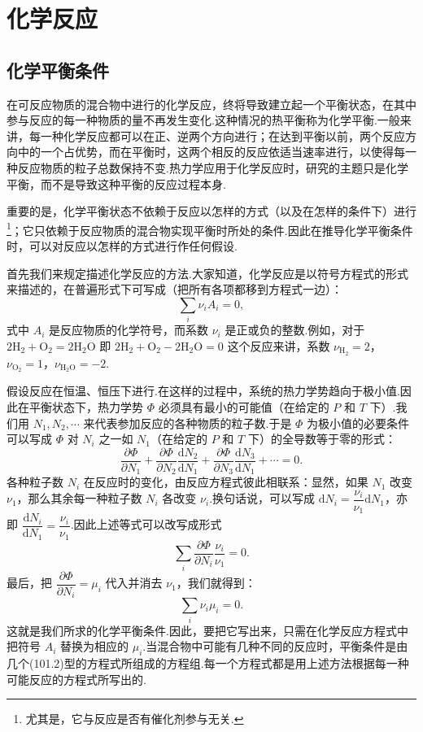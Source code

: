 \chapter{化学反应}

\section{化学平衡条件}

在可反应物质的混合物中进行的化学反应，终将导致建立起一个平衡状态，在其中参与反应的每一种物质的量不再发生变化.这种情况的热平衡称为化学平衡.一般来讲，每一种化学反应都可以在正、逆两个方向进行；在达到平衡以前，两个反应方向中的一个占优势，而在平衡时，这两个相反的反应依适当速率进行，以使得每一种反应物质的粒子总数保持不变.热力学应用于化学反应时，研究的主题只是化学平衡，而不是导致这种平衡的反应过程本身.

重要的是，化学平衡状态不依赖于反应以怎样的方式（以及在怎样的条件下）进行\footnote{尤其是，它与反应是否有催化剂参与无关.}；它只依赖于反应物质的混合物实现平衡时所处的条件.因此在推导化学平衡条件时，可以对反应以怎样的方式进行作任何假设.

首先我们来规定描述化学反应的方法.大家知道，化学反应是以符号方程式的形式来描述的，在普遍形式下可写成（把所有各项都移到方程式一边）：
\begin{equation}
  \sum_i\nu_iA_i=0,
\end{equation}
式中 $A_i$ 是反应物质的化学符号，而系数 $\nu_i$ 是正或负的整数.例如，对于 $2\mathrm{H}_2+\mathrm{O}_2=2\mathrm{H}_2\mathrm{O}$ 即 $2\mathrm{H}_2+\mathrm{O}_2-2\mathrm{H}_2\mathrm{O}=0$ 这个反应来讲，系数 $\nu_{\mathrm{H}_2}=2$，$\nu_{\mathrm{O}_2}=1$，$\nu_{\mathrm{H}_2\mathrm{O}}=-2$.

假设反应在恒温、恒压下进行.在这样的过程中，系统的热力学势趋向于极小值.因此在平衡状态下，热力学势 $\Phi$ 必须具有最小的可能值（在给定的 $P$ 和 $T$ 下）.我们用 $N_1,N_2,\cdots$ 来代表参加反应的各种物质的粒子数.于是 $\Phi$ 为极小值的必要条件可以写成 $\Phi$ 对 $N_i$ 之一如 $N_1$（在给定的 $P$ 和 $T$ 下）的全导数等于零的形式：
\begin{equation*}
  \frac{\partial\Phi}{\partial N_1}
  +\frac{\partial\Phi}{\partial N_2}\frac{\mathrm{d}N_2}{\mathrm{d}N_1}
  +\frac{\partial\Phi}{\partial N_3}\frac{\mathrm{d}N_3}{\mathrm{d}N_1}
  +\cdots=0.
\end{equation*}
各种粒子数 $N_i$ 在反应时的变化，由反应方程式彼此相联系：显然，如果 $N_1$ 改变 $\nu_1$，那么其余每一种粒子数 $N_i$ 各改变 $\nu_i$.换句话说，可以写成 $\mathrm{d}N_i=\dfrac{\nu_i}{\nu_1}\mathrm{d}N_1$，亦即 $\dfrac{\mathrm{d}N_i}{\mathrm{d}N_1}=\dfrac{\nu_i}{\nu_1}$.因此上述等式可以改写成形式
\begin{equation*}
  \sum_i\frac{\partial\Phi}{\partial N_i}\frac{\nu_i}{\nu_1}=0.
\end{equation*}
最后，把 $\dfrac{\partial\Phi}{\partial N_i}=\mu_i$ 代入并消去 $\nu_1$，我们就得到：
\begin{equation}
  \sum_i\nu_i\mu_i=0.
\end{equation}
这就是我们所求的化学平衡条件.因此，要把它写出来，只需在化学反应方程式中把符号 $A_i$ 替换为相应的 $\mu_i$.当混合物中可能有几种不同的反应时，平衡条件是由几个(101.2)型的方程式所组成的方程组.每一个方程式都是用上述方法根据每一种可能反应的方程式所写出的.


